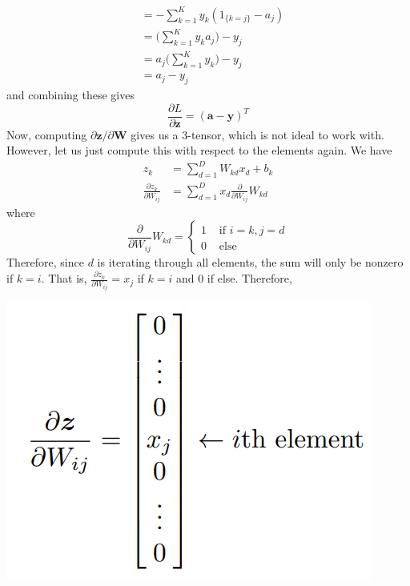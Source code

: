 \documentclass{article}
\begin{document}
\begin{theorem}
\begin{align*}
      & = - \sum_{k=1}^K y_k (1_{\{k = j\}} - a_j) \\
      & = \bigg( \sum_{k=1}^K y_k a_j \bigg) - y_j \\
      & = a_j \bigg( \sum_{k=1}^K y_k \bigg) - y_j \\
      & = a_j - y_j
    \end{align*}
    and combining these gives 
    \begin{equation}
      \frac{\partial L}{\partial \mathbf{z}} = (\mathbf{a} - \mathbf{y})^T
    \end{equation}
    Now, computing $\partial \mathbf{z} / \partial \mathbf{W}$ gives us a $3$-tensor, which is not ideal to work with. However, let us just compute this with respect to the elements again. We have 
    \begin{align*}
      z_k & = \sum_{d=1}^D W_{kd} x_d + b_k \\ 
      \frac{\partial z_k}{\partial W_{ij}} & = \sum_{d=1}^D x_d \frac{\partial}{\partial W_{ij}} W_{kd}
    \end{align*}
    where 
    \begin{equation}
      \frac{\partial}{\partial W_{ij}} W_{kd} = \begin{cases} 1 & \text{ if } i = k, j = d \\ 0 & \text{ else} \end{cases}
    \end{equation}
    Therefore, since $d$ is iterating through all elements, the sum will only be nonzero if $k = i$. That is, $\frac{\partial z_k}{\partial W_{ij}} = x_j$ if $k = i$ and $0$ if else. Therefore, 
    \begin{center}
      \includegraphics[scale=0.3]{img/softmax_deriv.png}

\end{center}
\end{theorem}
\end{document}
